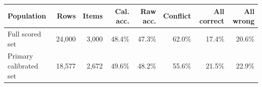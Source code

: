 \begin{tabular}{lrrrrrrr}
\toprule
Population & Rows & Items & Cal. acc. & Raw acc. & Conflict & All correct & All wrong \\
\midrule
Full scored set & 24,000 & 3,000 & 48.4\% & 47.3\% & 62.0\% & 17.4\% & 20.6\% \\
Primary calibrated set & 18,577 & 2,672 & 49.6\% & 48.2\% & 55.6\% & 21.5\% & 22.9\% \\
\bottomrule
\end{tabular}
